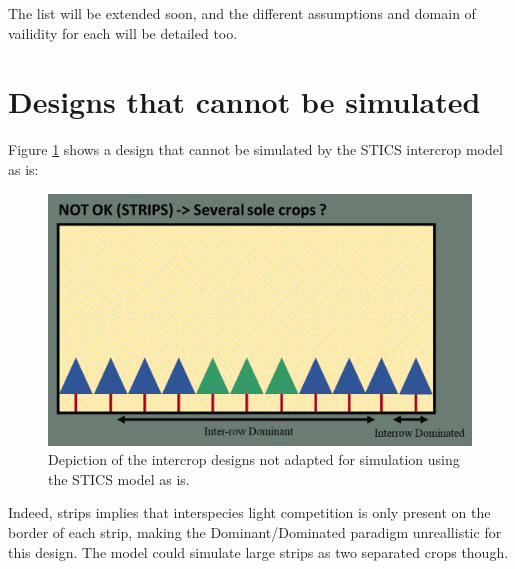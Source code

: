 \documentclass[]{book}
\theoremstyle{definition}
\theoremstyle{definition}
\theoremstyle{definition}
\theoremstyle{remark}
\begin{document}
The list will be extended soon, and the different assumptions and domain
of vailidity for each will be detailed too.

\section{Designs that cannot be
simulated}\label{designs-that-cannot-be-simulated}

Figure \ref{fig:DesignKO} shows a design that cannot be simulated by the
STICS intercrop model as is:

\begin{figure}
\centering
\includegraphics{img/Design_KO.png}
\caption{\label{fig:DesignKO}Depiction of the intercrop designs not adapted
for simulation using the STICS model as is.}
\end{figure}

Indeed, strips implies that interspecies light competition is only
present on the border of each strip, making the Dominant/Dominated
paradigm unreallistic for this design. The model could simulate large
strips as two separated crops though.


\end{document}
